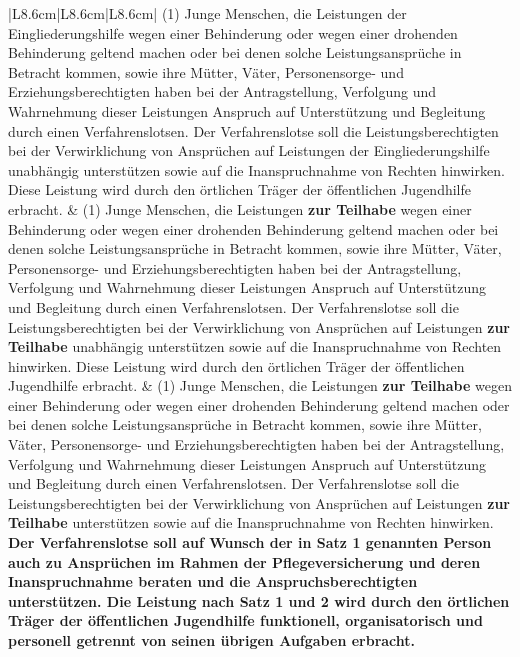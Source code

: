 \documentclass[10pt,a4paper,landscape]{article}
\begin{document}
\begin{longtable}{|L{8.6cm}|L{8.6cm}|L{8.6cm}|}
(1) Junge Menschen, die Leistungen der Eingliederungshilfe wegen einer Behinderung oder wegen einer drohenden Behinderung geltend machen oder bei denen solche Leistungsansprüche in Betracht kommen, sowie ihre Mütter, Väter, Personensorge- und Erziehungsberechtigten haben bei der Antragstellung, Verfolgung und Wahrnehmung dieser Leistungen Anspruch auf Unterstützung und Begleitung durch einen Verfahrenslotsen. Der Verfahrenslotse soll die Leistungsberechtigten bei der Verwirklichung von Ansprüchen auf Leistungen der Eingliederungshilfe unabhängig unterstützen sowie auf die Inanspruchnahme von Rechten hinwirken. Diese Leistung wird durch den örtlichen Träger der öffentlichen Jugendhilfe erbracht. & (1) Junge Menschen, die Leistungen \textbf{zur Teilhabe }wegen einer Behinderung oder wegen einer drohenden Behinderung geltend machen oder bei denen solche Leistungsansprüche in Betracht kommen, sowie ihre Mütter, Väter, Personensorge- und Erziehungsberechtigten haben bei der Antragstellung, Verfolgung und Wahrnehmung dieser Leistungen Anspruch auf Unterstützung und Begleitung durch einen Verfahrenslotsen. Der Verfahrenslotse soll die Leistungsberechtigten bei der Verwirklichung von Ansprüchen auf Leistungen \textbf{zur Teilhabe} unabhängig unterstützen sowie auf die Inanspruchnahme von Rechten hinwirken. Diese Leistung wird durch den örtlichen Träger der öffentlichen Jugendhilfe erbracht. & (1) Junge Menschen, die Leistungen \textbf{zur Teilhabe }wegen einer Behinderung oder wegen einer drohenden Behinderung geltend machen oder bei denen solche Leistungsansprüche in Betracht kommen, sowie ihre Mütter, Väter, Personensorge- und Erziehungsberechtigten haben bei der Antragstellung, Verfolgung und Wahrnehmung dieser Leistungen Anspruch auf Unterstützung und Begleitung durch einen Verfahrenslotsen. Der Verfahrenslotse soll die Leistungsberechtigten bei der Verwirklichung von Ansprüchen auf Leistungen \textbf{zur Teilhabe} unterstützen sowie auf die Inanspruchnahme von Rechten hinwirken. \textbf{Der Verfahrenslotse soll auf Wunsch der in Satz 1 genannten Person auch zu Ansprüchen im Rahmen der Pflegeversicherung und deren Inanspruchnahme beraten und die Anspruchsberechtigten unterstützen. Die Leistung nach Satz 1 und 2 wird durch den örtlichen Träger der öffentlichen Jugendhilfe funktionell, organisatorisch und personell getrennt von seinen übrigen Aufgaben erbracht.} \\
\hline

\end{longtable}
\end{document}
